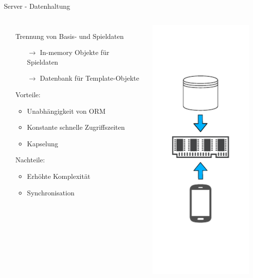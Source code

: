 \begin{frame}{Server - Datenhaltung}
	\begin{columns}
			\begin{itemize}
				\itemsep 12pt
				\item[] Trennung von Basis- und Spieldaten
				\begin{itemize}
					\itemsep 2pt
					\item[$\rightarrow$] In-memory Objekte für Spieldaten
					\item[$\rightarrow$] Datenbank für Template-Objekte   
				\end{itemize}
				\item[] Vorteile:
				\begin{itemize}
					\itemsep 2pt
					\item Unabhängigkeit von ORM
					\item Konstante schnelle Zugriffszeiten
					\item Kapselung
				\end{itemize}
				\item[] Nachteile:
				\begin{itemize}
					\itemsep 2pt
					\item Erhöhte Komplexität
					\item Synchronisation
				\end{itemize}
			\end{itemize}
			\includegraphics[height=\textheight]{images/server/datenhaltung.pdf}
	\end{columns} 
\end{frame}


